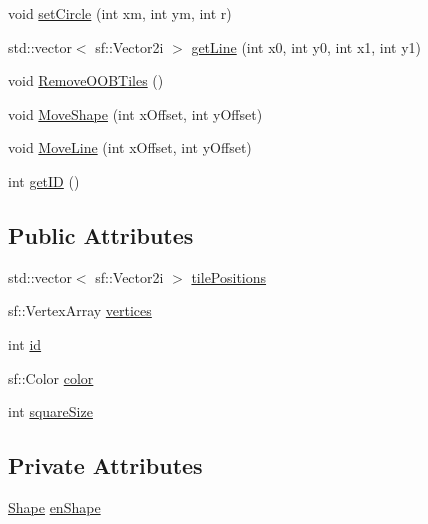 \begin{DoxyCompactItemize}
\item 
void \mbox{\hyperlink{class_map_effect_af9023620bb63c6ca99855742585d5cbe}{set\+Circle}} (int xm, int ym, int r)
\item 
std\+::vector$<$ sf\+::\+Vector2i $>$ \mbox{\hyperlink{class_map_effect_a7aeebd5eef57c00feabca583a38c5361}{get\+Line}} (int x0, int y0, int x1, int y1)
\item 
void \mbox{\hyperlink{class_map_effect_a515c5ddb85a15fd44b2b8d27c1cee21a}{Remove\+O\+O\+B\+Tiles}} ()
\item 
void \mbox{\hyperlink{class_map_effect_a4a775648e056eda586a1d627467552d7}{Move\+Shape}} (int x\+Offset, int y\+Offset)
\item 
void \mbox{\hyperlink{class_map_effect_a0436f9350a55dabc183dd66024dc7895}{Move\+Line}} (int x\+Offset, int y\+Offset)
\item 
int \mbox{\hyperlink{class_map_effect_af05848201790b0038c5b61659b116706}{get\+ID}} ()
\end{DoxyCompactItemize}
\subsection*{Public Attributes}
\begin{DoxyCompactItemize}
\item 
std\+::vector$<$ sf\+::\+Vector2i $>$ \mbox{\hyperlink{class_map_effect_a3a61ab548ae00ef7abd123672c75e579}{tile\+Positions}}
\item 
sf\+::\+Vertex\+Array \mbox{\hyperlink{class_map_effect_ae3ee2ef0f261d4527b5af20e788af26e}{vertices}}
\item 
int \mbox{\hyperlink{class_map_effect_a9439d21ddced564043eba8fdf2c0e44e}{id}}
\item 
sf\+::\+Color \mbox{\hyperlink{class_map_effect_ae542c1aef75e386b30ec544c2dd411d3}{color}}
\item 
int \mbox{\hyperlink{class_map_effect_a4fb92217a562e90b9038977a2d660e25}{square\+Size}}
\end{DoxyCompactItemize}
\subsection*{Private Attributes}
\begin{DoxyCompactItemize}
\item 
\mbox{\hyperlink{_map_effect_8hpp_a55b506070847a13554f8b879c1bfb37c}{Shape}} \mbox{\hyperlink{class_map_effect_a3bf3a8ffe6c838dad83356be63b986f5}{en\+Shape}}
\end{DoxyCompactItemize}


